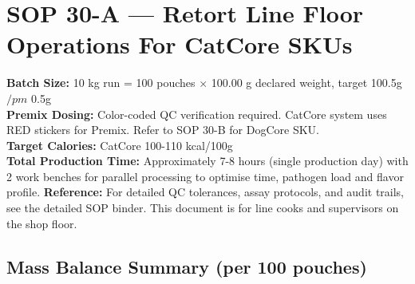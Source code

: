 
\section*{SOP 30-A --- Retort Line Floor Operations For CatCore SKUs}
\label{sop:retort_line}

\textbf{Batch Size:} 10 kg run = 100 pouches $\times$ 100.00 g declared weight, target 100.5g $/pm$ 0.5g \\
\textbf{Premix Dosing:} Color-coded QC verification required.
CatCore system uses RED stickers for Premix. Refer to SOP 30-B for DogCore SKU.\\
\textbf{Target Calories:} CatCore 100-110 kcal/100g \\
\textbf{Total Production Time:} Approximately 7-8 hours (single production day) with 2 work benches for parallel processing to optimise time, pathogen load and flavor profile.
\vspace{1em}
\noindent\textbf{Reference:} For detailed QC tolerances, assay protocols, and audit trails, see the detailed SOP binder.
This document is for line cooks and supervisors on the shop floor.
\vspace{1em}


\subsection*{Mass Balance Summary (per 100 pouches)}

